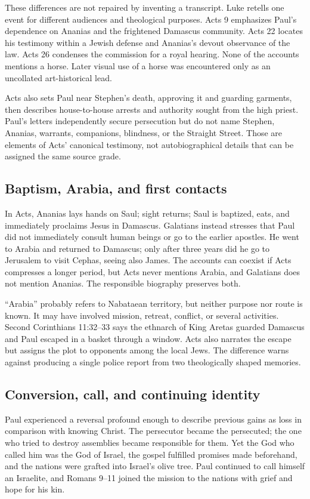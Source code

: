 These differences are not repaired by inventing a transcript. Luke retells
one event for different audiences and theological purposes. Acts 9 emphasizes
Paul's dependence on Ananias and the frightened Damascus community. Acts 22
locates his testimony within a Jewish defense and Ananias's devout observance
of the law. Acts 26 condenses the commission for a royal hearing. None of the
accounts mentions a horse. Later visual use of a horse was encountered only as
an uncollated art-historical lead.

Acts also sets Paul near Stephen's death, approving it and guarding garments,
then describes house-to-house arrests and authority sought from the high
priest. Paul's letters independently secure persecution but do not name
Stephen, Ananias, warrants, companions, blindness, or the Straight Street.
Those are elements of Acts' canonical testimony, not autobiographical details
that can be assigned the same source grade.

\subsection{Baptism, Arabia, and first contacts}

In Acts, Ananias lays hands on Saul; sight returns; Saul is baptized, eats, and
immediately proclaims Jesus in Damascus. Galatians instead stresses that Paul
did not immediately consult human beings or go to the earlier apostles. He
went to Arabia and returned to Damascus; only after three years did he go to
Jerusalem to visit Cephas, seeing also James. The accounts can coexist if Acts
compresses a longer period, but Acts never mentions Arabia, and Galatians does
not mention Ananias. The responsible biography preserves both.

``Arabia'' probably refers to Nabataean territory, but neither purpose nor
route is known. It may have involved mission, retreat, conflict, or several
activities. Second Corinthians 11:32--33 says the ethnarch of King Aretas
guarded Damascus and Paul escaped in a basket through a window. Acts also
narrates the escape but assigns the plot to opponents among the local Jews.
The difference warns against producing a single police report from two
theologically shaped memories.

\subsection{Conversion, call, and continuing identity}

Paul experienced a reversal profound enough to describe previous gains as
loss in comparison with knowing Christ. The persecutor became the
persecuted; the one who tried to destroy assemblies became responsible for
them. Yet the God who called him was the God of Israel, the gospel fulfilled
promises made beforehand, and the nations were grafted into Israel's olive
tree. Paul continued to call himself an Israelite, and Romans 9--11 joined the
mission to the nations with grief and hope for his kin.

